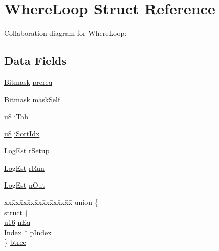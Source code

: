 \hypertarget{struct_where_loop}{}\section{Where\+Loop Struct Reference}
\label{struct_where_loop}


Collaboration diagram for Where\+Loop\+:
\subsection*{Data Fields}
\begin{DoxyCompactItemize}
\item 
\hyperlink{sqlite3_8c_afa77b629897c4457bfdc47d364ba5c3f}{Bitmask} \hyperlink{struct_where_loop_aae7565677c852f3ea5f63a3d5fae63a7}{prereq}
\item 
\hyperlink{sqlite3_8c_afa77b629897c4457bfdc47d364ba5c3f}{Bitmask} \hyperlink{struct_where_loop_a64568f8369d027c1d3988c5bcf827126}{mask\+Self}
\item 
\hyperlink{sqlite3_8c_a74a0f6424ae628af25f23f0a35f6ead3}{u8} \hyperlink{struct_where_loop_a41a4c5b9a04bd1b37b6509a0be68fb8c}{i\+Tab}
\item 
\hyperlink{sqlite3_8c_a74a0f6424ae628af25f23f0a35f6ead3}{u8} \hyperlink{struct_where_loop_a97de1d9f0de4b544e2eb6cd2b01dd026}{i\+Sort\+Idx}
\item 
\hyperlink{sqlite3_8c_aa0f9b3b63ad120ac15b96785b05ce733}{Log\+Est} \hyperlink{struct_where_loop_a9141f9ef602baa41618d3dd9f85af0f3}{r\+Setup}
\item 
\hyperlink{sqlite3_8c_aa0f9b3b63ad120ac15b96785b05ce733}{Log\+Est} \hyperlink{struct_where_loop_a19a591aa81312e9d7f3e26df94f10abe}{r\+Run}
\item 
\hyperlink{sqlite3_8c_aa0f9b3b63ad120ac15b96785b05ce733}{Log\+Est} \hyperlink{struct_where_loop_a0aa5ee9015b877549b7fceef6a0e81c5}{n\+Out}
\item 
\begin{tabbing}
xx\=xx\=xx\=xx\=xx\=xx\=xx\=xx\=xx\=\kill
union \{\\
\>struct \{\\
\>\>\hyperlink{sqlite3_8c_a20f2299e322dcbde37cb07b16910b843}{u16} \hyperlink{struct_where_loop_ab51e96dea9598ce3eeded5cbe74fecf4}{nEq}\\
\>\>\hyperlink{struct_index}{Index} $\ast$ \hyperlink{struct_where_loop_a2bf7196ac1f39bd4b9dc95c3a9e9a68e}{pIndex}\\
\>\} \hyperlink{struct_where_loop_aabcedf1144f01ab1953a0a330f5f2851}{btree}\\

\end{tabbing}
\end{DoxyCompactItemize}
